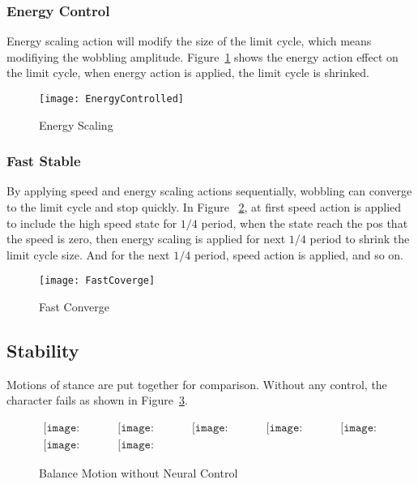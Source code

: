 \subsubsection*{Energy Control}
Energy scaling action will modify the size of the limit cycle, which means modifiying the wobbling amplitude.
Figure~\ref{fig:energyscaling} shows the energy action effect on the limit cycle, when energy action is applied, the limit cycle is shrinked.


\begin{figure}[!htbp]
  \begin{center}
      \texttt{[image: EnergyControlled]}
    \caption{Energy Scaling}
    \label{fig:energyscaling}
\end{center}
\end{figure}





\subsubsection*{Fast Stable}
By applying speed and energy scaling actions sequentially, wobbling can converge to the limit cycle and stop quickly.
In Figure ~\ref{fig:fastconverg}, at first speed action is applied to include the high speed state for $1/4$ period, when the state reach the pos that the speed is zero, then energy scaling is applied for next $1/4$ period to shrink the limit cycle size.
And for the next $1/4$ period, speed action is applied, and so on.

\begin{figure}[!htbp]
  \begin{center}
      \texttt{[image: FastCoverge]}
    \caption{Fast Converge}
    \label{fig:fastconverg}
\end{center}
\end{figure}

\subsection{Stability}
Motions of stance are put together for comparison.
Without any control, the character fails as shown in Figure~\ref{fig:stancefall}.
\begin{figure}[h]
\begin{center}$
\begin{array}{ccccc}
\texttt{[image: stanceFall/0001.eps]}&
\texttt{[image: stanceFall/0021.eps]}&
\texttt{[image: stanceFall/0041.eps]}&
\texttt{[image: stanceFall/0061.eps]}&
\texttt{[image: stanceFall/0081.eps]}
\\
\texttt{[image: stanceFall/0101.eps]}&
\texttt{[image: stanceFall/0121.eps]}
\end{array}$
\end{center}
\caption{Balance Motion without Neural Control}
    \label{fig:stancefall}
\end{figure}

